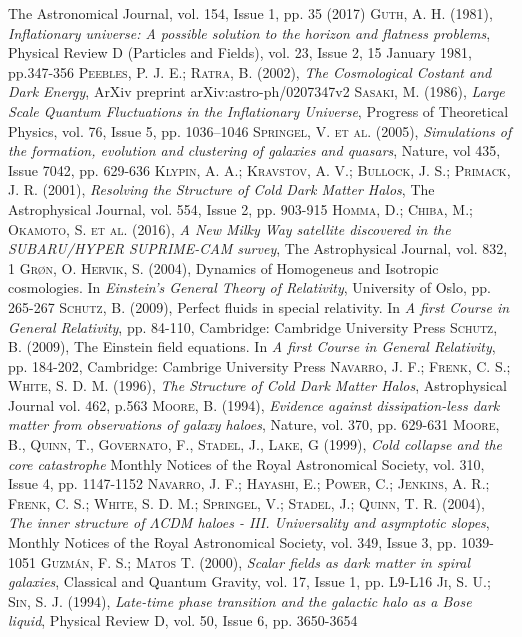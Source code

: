 \documentclass[a4paper,openright,12pt]{book}
\begin{document}
\begin{thebibliography}{a}
The Astronomical Journal, vol. 154, Issue 1, pp. 35 (2017)
 \textsc{Guth, A. H. (1981)},
\textit{Inflationary universe: A possible solution to the horizon and flatness problems},
Physical Review D (Particles and Fields), vol. 23, Issue 2, 15 January 1981, pp.347-356
 \textsc{Peebles, P. J. E.; Ratra, B. (2002)},
\textit{The Cosmological Costant and Dark Energy},
ArXiv preprint arXiv:astro-ph/0207347v2
 \textsc{Sasaki, M. (1986)},
\textit{Large Scale Quantum Fluctuations in the Inflationary Universe},
Progress of Theoretical Physics, vol. 76, Issue 5, pp. 1036–1046
 \textsc{Springel, V. et al. (2005)},
\textit{Simulations of the formation, evolution and clustering of galaxies and quasars},
Nature, vol 435, Issue 7042, pp. 629-636
 \textsc{Klypin, A. A.; Kravstov, A. V.; Bullock, J. S.; Primack, J. R. (2001)},
\textit{Resolving the Structure of Cold Dark Matter Halos},
The Astrophysical Journal, vol. 554, Issue 2, pp. 903-915
 \textsc{Homma, D.; Chiba, M.; Okamoto, S. et al. (2016)},
\textit{A New Milky Way satellite discovered in the SUBARU/HYPER SUPRIME-CAM survey},
The Astrophysical Journal, vol. 832, 1
 \textsc{ Grøn, O. Hervik, S. (2004)},
Dynamics of Homogeneus and Isotropic cosmologies. In
\textit{Einstein's General Theory of Relativity},
University of Oslo, pp. 265-267
 \textsc{Schutz, B. (2009)},
Perfect fluids in special relativity. In 
\textit{A first Course in General Relativity},
pp. 84-110, Cambridge: Cambridge University Press
 \textsc{Schutz, B. (2009)},
The Einstein field equations. In
\textit{A first Course in General Relativity},
pp. 184-202, Cambridge: Cambrige University Press
 \textsc{Navarro, J. F.; Frenk, C. S.; White, S. D. M. (1996)},
\textit{The Structure of Cold Dark Matter Halos},
Astrophysical Journal vol. 462, p.563
 \textsc{Moore, B. (1994)},
\textit{Evidence against dissipation-less dark matter from observations of galaxy haloes},
Nature, vol. 370, pp. 629-631 
 \textsc{Moore, B., Quinn, T., Governato, F., Stadel, J., Lake, G (1999)},
\textit{Cold collapse and the core catastrophe}
Monthly Notices of the Royal Astronomical Society, vol. 310, Issue 4, pp. 1147-1152
 \textsc{Navarro, J. F.; Hayashi, E.; Power, C.; Jenkins, A. R.; Frenk, C. S.; White, S. D. M.; Springel, V.; Stadel, J.; Quinn, T. R. (2004)}, 
\textit{The inner structure of $\Lambda$CDM haloes - III. Universality and asymptotic slopes}, 
Monthly Notices of the Royal Astronomical Society, vol. 349, Issue 3, pp. 1039-1051
 \textsc{Guzmán, F. S.; Matos T. (2000)}, 
\textit{Scalar fields as dark matter in spiral galaxies},
Classical and Quantum Gravity, vol. 17, Issue 1, pp. L9-L16 
 \textsc{Ji, S. U.; Sin, S. J. (1994)},
\textit{Late-time phase transition and the galactic halo as a Bose liquid},
Physical Review D, vol. 50, Issue 6, pp. 3650-3654 


\end{thebibliography}
\end{document}
